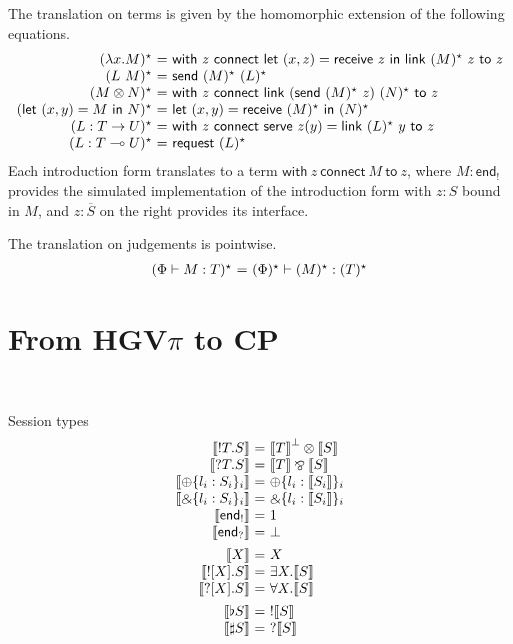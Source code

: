 \documentclass{easychair}
\makeatletter
\newcommand{\ba}{\begin{array}}
\newcommand{\ea}{\end{array}}
\newenvironment{equations}{\[\ba{@{}r@{~}c@{~}l@{}}}{\ea\]}
\newcommand{\key}{\mathsf}
\newcommand{\set}[1]{\{ #1 \}}
\newcommand{\row}[2]{\set{#1}_{#2}}
\newcommand{\gvOutput}[2]{\mathord{!}{#1}.{#2}}
\newcommand{\gvInput}[2]{\mathord{?}{#1}.{#2}}
\newcommand{\gvEndOutput}{\key{end}_!}
\newcommand{\gvEndInput}{\key{end}_?}
\newcommand{\gvPlus}[2]{\oplus \row{#1}{#2}}
\newcommand{\gvChoice}[2]{\binampersand \row{#1}{#2}}
\newcommand{\gvServer}[1]{\flat {#1}}
\newcommand{\gvService}[1]{\sharp {#1}}
\newcommand{\gvDual}[1]{\overline{#1}}
\newcommand{\gvOutputType}[2]{![{#1}].{#2}}
\newcommand{\gvInputType}[2]{?[{#1}].{#2}}
\newcommand{\gvj}[3]{{#1} \vdash {#2} : {#3}}
\newcommand{\la}{l}
\newcommand{\lolli}{\multimap}
\newcommand{\gvLinFun}[2]{{#1} \lolli {#2}}
\newcommand{\gvUnFun}[2]{{#1} \to {#2}}
\newcommand{\gvTimes}[2]{{#1} \otimes {#2}}
\newcommand{\gvLink}[2]{\key{link}~{#1}~{#2}}
\newcommand{\gvLam}[2]{\lambda {#1}.{#2}}
\newcommand{\gvApp}[2]{{#1}~{#2}}
\newcommand{\gvPair}[2]{({#1},{#2})}
\newcommand{\gvLet}[3]{\key{let}~{#1}={#2}~\key{in}~{#3}}
\newcommand{\gvSend}[2]{\key{send}~{#1}~{#2}}
\newcommand{\gvReceive}[1]{\key{receive}~{#1}}
\newcommand{\gvWith}[3]{\key{with}~{#1}~\key{connect}~{#2}~\key{to}~{#3}}
\newcommand{\gvServe}[3]{\key{serve}~{#1}({#2})={#3}}
\newcommand{\gvRequest}[1]{\key{request}~{#1}}
\newcommand{\cpTimes}[2]{{#1} \otimes {#2}}
\newcommand{\cpPar}[2]{{#1} \mathbin{\bindnasrepma} {#2}}
\newcommand{\cpPlus}[2]{\oplus \row{#1}{#2}}
\newcommand{\cpWith}[2]{\binampersand \row{#1}{#2}}
\newcommand{\cpOne}{1}
\newcommand{\cpBottom}{\bot}
\newcommand{\cpOfCourse}[1]{!{#1}}
\newcommand{\cpWhyNot}[1]{?{#1}}
\newcommand{\cpDual}[1]{{#1}^\bot}
\newcommand{\cpExists}[2]{\exists {#1}.{#2}}
\newcommand{\cpForall}[2]{\forall {#1}.{#2}}
\newcommand{\hgvpi}{HGV$\pi$\xspace}
\makeatother
\begin{document}
The translation on terms is given by the homomorphic extension of the
following equations.
\begin{equations}
\lampi{\gvLam{x}{M}} &=& \gvWith{z}{\gvLet{\gvPair{x}{z}}{\gvReceive{z}}{\gvLink{\lampi{M}}{z}}}{z} \\
\lampi{\gvApp{L}{M}} &=& \gvSend{\lampi{M}}{\lampi{L}} \\
\lampi{\gvTimes{M}{N}} &=&
  \gvWith{z}
    {\gvLink{(\gvSend{\lampi{M}}{z})}{\lampi{N}}}
    {z} \\
\lampi{\gvLet{\gvPair{x}{y}}{M}{N}} &=&
    \gvLet{\gvPair{x}{y}}{\gvReceive{\lampi{M}}}{\lampi{N}} \\
\lampi{L : \gvUnFun{T}{U}} &=&
  \gvWith{z}{\gvServe{z}{y}{\gvLink{\lampi{L}}{y}}}{z} \\
\lampi{L : \gvLinFun{T}{U}} &=& \gvRequest{\lampi{L}} \\
\end{equations}%
Each introduction form translates to a term $\gvWith{z}{M}{z}$, where
$M : \gvEndOutput$ provides the simulated implementation of the
introduction form with $z : S$ bound in $M$, and $z : \gvDual{S}$ on
the right provides its interface.

The translation on judgements is pointwise.
%
\begin{equations}
\lampi{\gvj{\Phi}{M}{T}} &=& \gvj{\lampi{\Phi}}{\lampi{M}}{\lampi{T}} \\
\end{equations}%


\section{From \hgvpi to CP}
~

\newcommand{\hgvcp}[1]{\llbracket{#1}\rrbracket}

Session types
\begin{equations}
\hgvcp{\gvOutput{T}{S}}        &=& \cpTimes{\cpDual{\hgvcp{T}}}{\hgvcp{S}} \\
\hgvcp{\gvInput{T}{S}}         &=& \cpPar{\hgvcp{T}}{\hgvcp{S}} \\
\hgvcp{\gvPlus{\la_i:S_i}{i}}   &=& \cpPlus{\la_i:\hgvcp{S_i}}{i} \\
\hgvcp{\gvChoice{\la_i:S_i}{i}} &=& \cpWith{\la_i:\hgvcp{S_i}}{i} \\
\hgvcp{\gvEndOutput}              &=& \cpOne \\
\hgvcp{\gvEndInput}               &=& \cpBottom \\[1ex]

\hgvcp{X}                       &=& X \\
\hgvcp{\gvOutputType{X}{S}}     &=& \cpExists{X}{\hgvcp{S}} \\
\hgvcp{\gvInputType{X}{S}}      &=& \cpForall{X}{\hgvcp{S}} \\[1ex]

\hgvcp{\gvServer{S}}  &=& \cpOfCourse{\hgvcp{S}} \\
\hgvcp{\gvService{S}} &=& \cpWhyNot{\hgvcp{S}} \\[1ex]
\end{equations}
\end{document}

